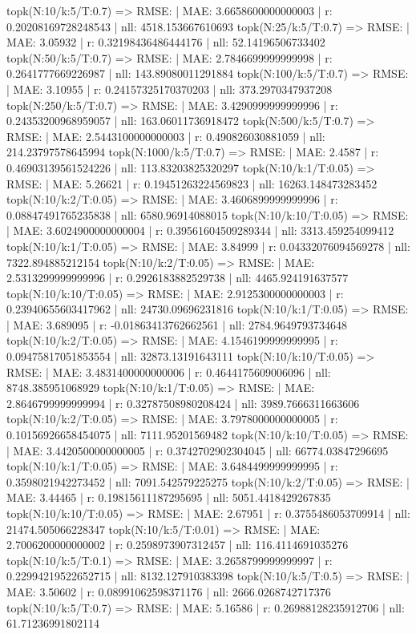 topk(N:10/k:5/T:0.7) => RMSE: | MAE: 3.6658600000000003 | r: 0.20208169728248543 | nll: 4518.153667610693
topk(N:25/k:5/T:0.7) => RMSE: | MAE: 3.05932 | r: 0.32198436486444176 | nll: 52.14196506733402
topk(N:50/k:5/T:0.7) => RMSE: | MAE: 2.7846699999999998 | r: 0.2641777669226987 | nll: 143.89080011291884
topk(N:100/k:5/T:0.7) => RMSE: | MAE: 3.10955 | r: 0.24157325170370203 | nll: 373.2970347937208
topk(N:250/k:5/T:0.7) => RMSE: | MAE: 3.4290999999999996 | r: 0.24353200968959057 | nll: 163.06011736918472
topk(N:500/k:5/T:0.7) => RMSE: | MAE: 2.5443100000000003 | r: 0.490826030881059 | nll: 214.23797578645994
topk(N:1000/k:5/T:0.7) => RMSE: | MAE: 2.4587 | r: 0.46903139561524226 | nll: 113.83203825320297
topk(N:10/k:1/T:0.05) => RMSE: | MAE: 5.26621 | r: 0.19451263224569823 | nll: 16263.148473283452
topk(N:10/k:2/T:0.05) => RMSE: | MAE: 3.4606899999999996 | r: 0.08847491765235838 | nll: 6580.96914088015
topk(N:10/k:10/T:0.05) => RMSE: | MAE: 3.6024900000000004 | r: 0.39561604509289344 | nll: 3313.459254099412
topk(N:10/k:1/T:0.05) => RMSE: | MAE: 3.84999 | r: 0.04332076094569278 | nll: 7322.894885212154
topk(N:10/k:2/T:0.05) => RMSE: | MAE: 2.5313299999999996 | r: 0.2926183882529738 | nll: 4465.924191637577
topk(N:10/k:10/T:0.05) => RMSE: | MAE: 2.9125300000000003 | r: 0.23940655603417962 | nll: 24730.09696231816
topk(N:10/k:1/T:0.05) => RMSE: | MAE: 3.689095 | r: -0.01863413762662561 | nll: 2784.9649793734648
topk(N:10/k:2/T:0.05) => RMSE: | MAE: 4.1546199999999995 | r: 0.09475817051853554 | nll: 32873.13191643111
topk(N:10/k:10/T:0.05) => RMSE: | MAE: 3.4831400000000006 | r: 0.4644175609006096 | nll: 8748.385951068929
topk(N:10/k:1/T:0.05) => RMSE: | MAE: 2.8646799999999994 | r: 0.32787508980208424 | nll: 3989.7666311663606
topk(N:10/k:2/T:0.05) => RMSE: | MAE: 3.7978000000000005 | r: 0.10156926658454075 | nll: 7111.95201569482
topk(N:10/k:10/T:0.05) => RMSE: | MAE: 3.4420500000000005 | r: 0.3742702902304045 | nll: 66774.03847296695
topk(N:10/k:1/T:0.05) => RMSE: | MAE: 3.6484499999999995 | r: 0.3598021942273452 | nll: 7091.542579225275
topk(N:10/k:2/T:0.05) => RMSE: | MAE: 3.44465 | r: 0.19815611187295695 | nll: 5051.4418429267835
topk(N:10/k:10/T:0.05) => RMSE: | MAE: 2.67951 | r: 0.3755486053709914 | nll: 21474.505066228347
topk(N:10/k:5/T:0.01) => RMSE: | MAE: 2.7006200000000002 | r: 0.2598973907312457 | nll: 116.4114691035276
topk(N:10/k:5/T:0.1) => RMSE: | MAE: 3.2658799999999997 | r: 0.22994219522652715 | nll: 8132.127910383398
topk(N:10/k:5/T:0.5) => RMSE: | MAE: 3.50602 | r: 0.08991062598371176 | nll: 2666.0268742717376
topk(N:10/k:5/T:0.7) => RMSE: | MAE: 5.16586 | r: 0.26988128235912706 | nll: 61.71236991802114

